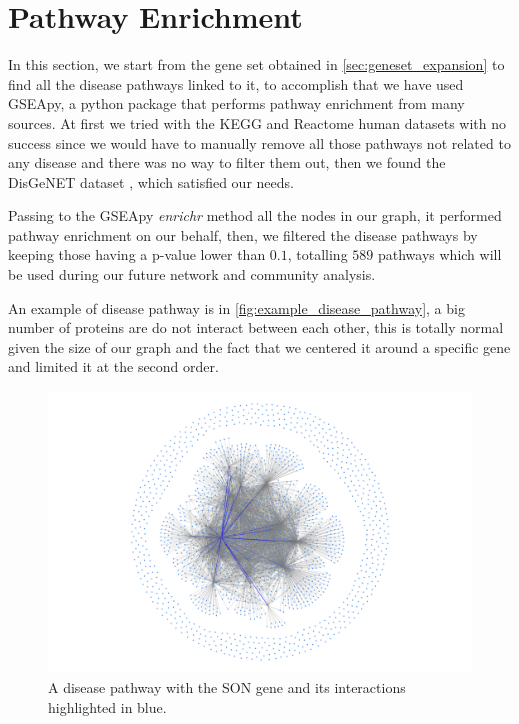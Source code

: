 \section{Pathway Enrichment}\label{sec:pathway_enrichment}
In this section, we start from the gene set obtained in \autoref{sec:geneset_expansion} to find all the disease pathways linked to it, to accomplish that we have used GSEApy, a python package that performs pathway enrichment from many sources. At first we tried with the KEGG and Reactome human datasets with no success since we would have to manually remove all those pathways not related to any disease and there was no way to filter them out, then we found the DisGeNET dataset \cite{disgenet}, which satisfied our needs.
\vspace{3mm}

Passing to the GSEApy \textit{enrichr} method all the nodes in our graph, it performed pathway enrichment on our behalf, then, we filtered the disease pathways by keeping those having a p-value lower than $0.1$, totalling $589$ pathways which will be used during our future network and community analysis.
\vspace{3mm}

An example of disease pathway is in \autoref{fig:example_disease_pathway}, a big number of proteins are do not interact between each other, this is totally normal given the size of our graph and the fact that we centered it around a specific gene and limited it at the second order.
\begin{figure}[H]
    \centering
    \includegraphics[width=1\linewidth]{images/plots/disease_pathway_graph.png}
    \caption{A disease pathway with the SON gene and its interactions highlighted in blue.}
    \label{fig:example_disease_pathway}
\end{figure}

